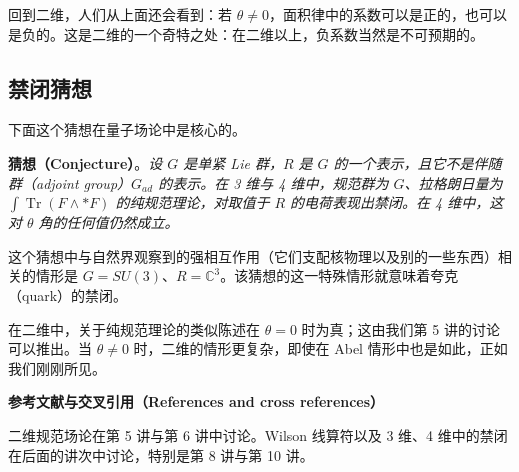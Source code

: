 回到二维，人们从上面还会看到：若 $\theta\neq0$，面积律中的系数可以是正的，也可以是负的。这是二维的一个奇特之处：在二维以上，负系数当然是不可预期的。

\subsection{禁闭猜想}

下面这个猜想在量子场论中是核心的。

\textbf{猜想（Conjecture）}。\textit{设 $G$ 是单紧 Lie 群，$R$ 是 $G$ 的一个表示，且它不是伴随群（adjoint group）$G_{ad}$ 的表示。在 3 维与 4 维中，规范群为 $G$、拉格朗日量为 $\int\operatorname{Tr}(F\wedge *F)$ 的纯规范理论，对取值于 $R$ 的电荷表现出禁闭。在 4 维中，这对 $\theta$ 角的任何值仍然成立。}

这个猜想中与自然界观察到的强相互作用（它们支配核物理以及别的一些东西）相关的情形是 $G=SU(3)$、$R=\mathbb{C}^3$。该猜想的这一特殊情形就意味着夸克（quark）的禁闭。

在二维中，关于纯规范理论的类似陈述在 $\theta=0$ 时为真；这由我们第 5 讲的讨论可以推出。当 $\theta\neq0$ 时，二维的情形更复杂，即使在 Abel 情形中也是如此，正如我们刚刚所见。

\medskip
\noindent\textbf{参考文献与交叉引用（References and cross references）}

二维规范场论在第 5 讲与第 6 讲中讨论。Wilson 线算符以及 3 维、4 维中的禁闭在后面的讲次中讨论，特别是第 8 讲与第 10 讲。
